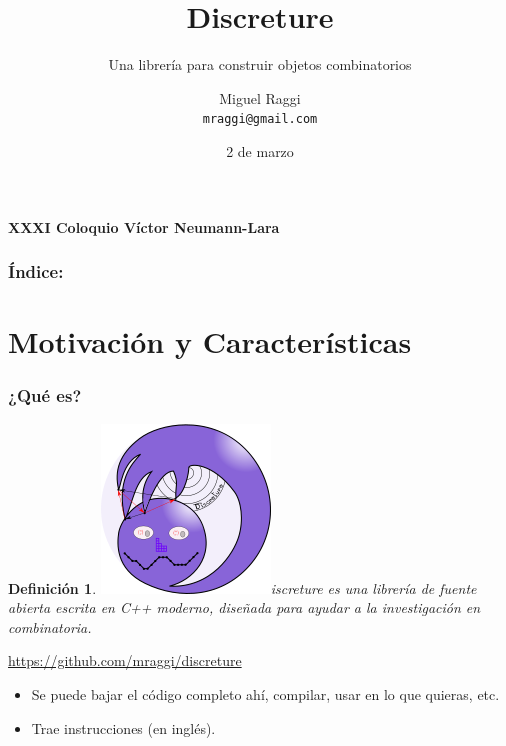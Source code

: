 \documentclass[spanish,professionalfonts]{beamer}
\title{Discreture}
\author{Miguel Raggi \\ \texttt{mraggi@gmail.com}}
\institute{Escuela Nacional de Estudios Superiores \\ UNAM}
\subtitle{Una librería para construir objetos combinatorios}
\date{2 de marzo}
\def\tcg#1{\textcolor{MyGreen}{#1}}
\def\tcp#1{\textcolor{MyPurple}{#1}}
\newtheorem{definicion}{Definición}
\begin{document}

\begin{frame}
\begin{center}
\large{\tcg{\textbf{XXXI Coloquio Víctor Neumann-Lara}}}
\end{center}
\titlepage
\end{frame}

\begin{frame}
\frametitle{Índice:}
\tableofcontents
\end{frame} 

\section{Motivación y Características}

\begin{frame}\frametitle{¿Qué es?}
  \begin{definicion}
    \includegraphics[scale=0.5]{../logoterelimpio.png}\tcp{iscreture} es una librería de fuente abierta escrita en C++ moderno, diseñada para ayudar a la investigación en combinatoria.
  \end{definicion} \pause

  \begin{center}
   \url{https://github.com/mraggi/discreture}
  \end{center}  \pause

  \begin{itemize}
    \item Se puede bajar el código completo ahí, compilar, usar en lo que quieras, etc.  \pause
    \item Trae instrucciones (en inglés).
  \end{itemize}

\end{frame}
\end{document}
